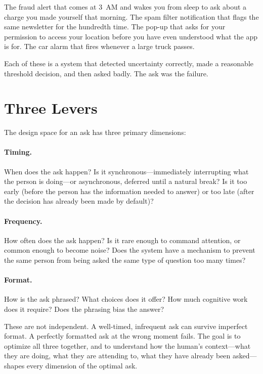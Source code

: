 The fraud alert that comes at 3~AM and wakes you from sleep to ask about a charge you made yourself that morning. The spam filter notification that flags the same newsletter for the hundredth time. The pop-up that asks for your permission to access your location before you have even understood what the app is for. The car alarm that fires whenever a large truck passes.

Each of these is a system that detected uncertainty correctly, made a reasonable threshold decision, and then asked badly. The ask was the failure.

\section{Three Levers}
\label{sec:ch05-three-levers}

The design space for an ask has three primary dimensions:

\paragraph{Timing.} When does the ask happen? Is it synchronous---immediately interrupting what the person is doing---or asynchronous, deferred until a natural break? Is it too early (before the person has the information needed to answer) or too late (after the decision has already been made by default)?

\paragraph{Frequency.} How often does the ask happen? Is it rare enough to command attention, or common enough to become noise? Does the system have a mechanism to prevent the same person from being asked the same type of question too many times?

\paragraph{Format.} How is the ask phrased? What choices does it offer? How much cognitive work does it require? Does the phrasing bias the answer?

These are not independent. A well-timed, infrequent ask can survive imperfect format. A perfectly formatted ask at the wrong moment fails. The goal is to optimize all three together, and to understand how the human's context---what they are doing, what they are attending to, what they have already been asked---shapes every dimension of the optimal ask.

